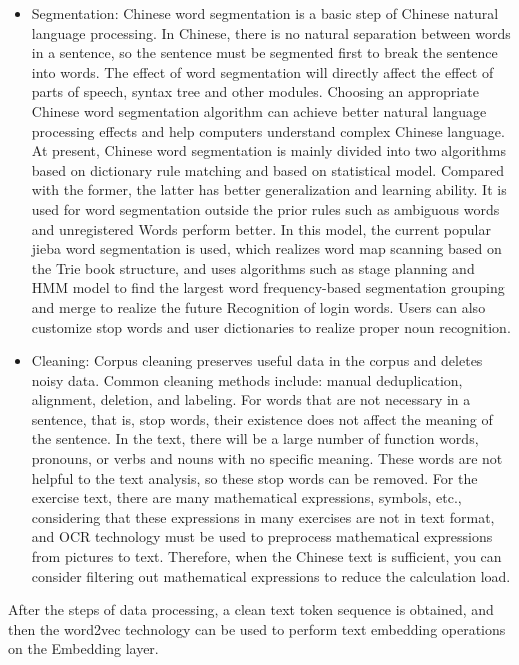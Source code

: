 \begin{itemize}
	\item Segmentation: Chinese word segmentation is a basic step of Chinese natural language processing. In Chinese, there is no natural separation between words in a sentence, so the sentence must be segmented first to break the sentence into words. The effect of word segmentation will directly affect the effect of parts of speech, syntax tree and other modules. Choosing an appropriate Chinese word segmentation algorithm can achieve better natural language processing effects and help computers understand complex Chinese language. At present, Chinese word segmentation is mainly divided into two algorithms based on dictionary rule matching and based on statistical model. Compared with the former, the latter has better generalization and learning ability. It is used for word segmentation outside the prior rules such as ambiguous words and unregistered Words perform better. In this model, the current popular jieba word segmentation is used, which realizes word map scanning based on the Trie book structure, and uses algorithms such as stage planning and HMM model to find the largest word frequency-based segmentation grouping and merge to realize the future Recognition of login words. Users can also customize stop words and user dictionaries to realize proper noun recognition.
	\item Cleaning: Corpus cleaning preserves useful data in the corpus and deletes noisy data. Common cleaning methods include: manual deduplication, alignment, deletion, and labeling. For words that are not necessary in a sentence, that is, stop words, their existence does not affect the meaning of the sentence. In the text, there will be a large number of function words, pronouns, or verbs and nouns with no specific meaning. These words are not helpful to the text analysis, so these stop words can be removed. For the exercise text, there are many mathematical expressions, symbols, etc., considering that these expressions in many exercises are not in text format, and OCR technology must be used to preprocess mathematical expressions from pictures to text. Therefore, when the Chinese text is sufficient, you can consider filtering out mathematical expressions to reduce the calculation load.
\end{itemize}

After the steps of data processing, a clean text token sequence is obtained, and then the word2vec technology can be used to perform text embedding operations on the Embedding layer.

